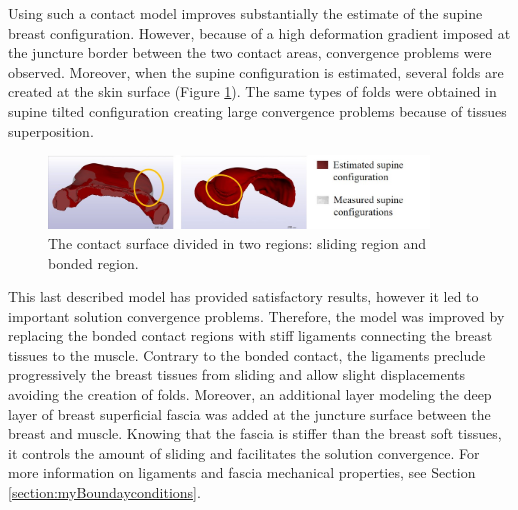 Using such a contact model improves substantially the estimate of the supine breast configuration. However, because of a high deformation gradient imposed at the juncture border between the two contact areas, convergence problems were observed. Moreover, when the supine configuration is estimated, several folds are created at the skin surface (Figure \ref{fig:mistcontactresults}). The same types of folds were obtained in supine tilted configuration creating large convergence problems because of tissues superposition.

\begin{figure}[!h]
\centering
\includegraphics[width=0.9\textwidth,keepaspectratio]{figures/mixt_contact_supine.jpg} 
\caption{The contact surface divided in two regions: sliding region and bonded region.}
\label{fig:mistcontactresults}
\end{figure}

This last described model has provided satisfactory results, however it led to important solution convergence problems. Therefore, the model was improved by replacing the bonded contact regions with stiff ligaments connecting the breast tissues to the muscle.  Contrary to the bonded contact, the ligaments preclude progressively the breast tissues from sliding and allow slight displacements avoiding the creation of folds. Moreover, an additional layer modeling the deep layer of breast superficial fascia was added at the juncture surface between the breast and muscle. Knowing that the fascia is stiffer than the breast soft tissues, it controls the amount of sliding and facilitates the solution convergence. For more information on ligaments and fascia mechanical properties, see Section \ref{section:myBoundayconditions}.
